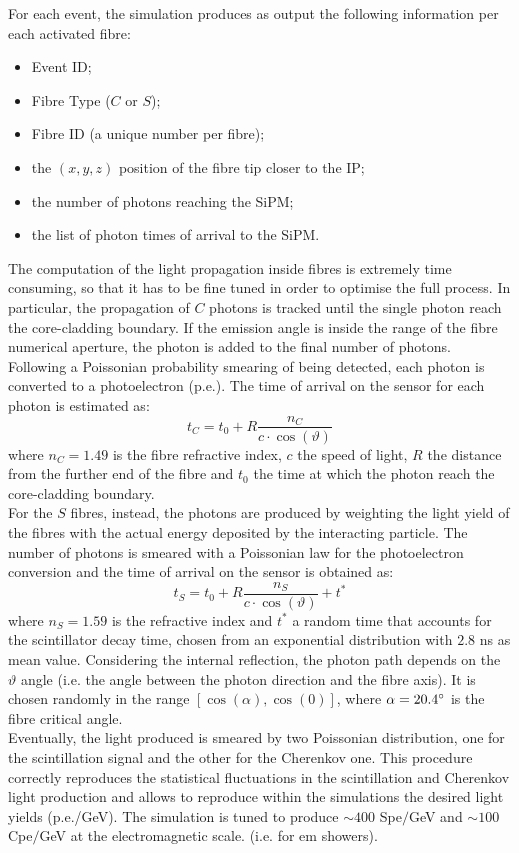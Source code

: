 For each event, the simulation produces as output the following information per each activated fibre: 
\begin{itemize}
	\item Event ID;
	\item Fibre Type ($C$ or $S$);
	\item Fibre ID (a unique number per fibre);
	\item the $(x,y,z)$ position of the fibre tip closer to the IP;
	\item the number of photons reaching the SiPM;
	\item the list of photon times of arrival to the SiPM.
\end{itemize}

The computation of the light propagation inside fibres is extremely time consuming, so that it has to be fine tuned in order to optimise the full process. In particular, the propagation of $C$ photons is tracked until the single photon reach the core-cladding boundary. If the emission angle is inside the range of the fibre numerical aperture, the photon is added to the final number of photons. Following a Poissonian probability smearing of being detected, each photon is converted to a photoelectron (p.e.).
The time of arrival on the sensor for each photon is estimated as:
\begin{equation}
t_C = t_0 + R \frac{n_C}{c\cdot \cos(\vartheta)}
\end{equation}
where $n_C = 1.49$ is the fibre refractive index, $c$ the speed of light, $R$ the distance from the further end of the fibre and $t_0$ the time at which the photon reach the core-cladding boundary.\\

For the $S$ fibres, instead, the photons are produced by weighting the light yield of the fibres with the actual energy deposited by the interacting particle. The number of photons is smeared with a Poissonian law for the photoelectron conversion and the time of arrival on the sensor is obtained as:
\begin{equation}
	t_S = t_0 + R\frac{n_S}{c\cdot \cos(\vartheta)} + t^*
\end{equation}
where $n_S = 1.59$ is the refractive index and $t^*$ a random time that accounts for the scintillator decay time, chosen from an exponential distribution with $2.8$ ns as mean value.
Considering the internal reflection, the photon path depends on the $\vartheta$ angle (i.e. the angle between the photon direction and the fibre axis). It is chosen randomly in the range $[\cos(\alpha),\cos(0)]$, where $\alpha = 20.4\degree$ is the fibre critical angle.\\
Eventually, the light produced is smeared by two Poissonian distribution, one for the scintillation signal and the other for the Cherenkov one. This procedure correctly reproduces the statistical fluctuations in the scintillation and Cherenkov light production and allows to reproduce within the simulations the desired light yields (p.e./GeV).
The simulation is tuned to produce $\sim 400$ Spe$/$GeV and $\sim 100$ Cpe$/$GeV at the electromagnetic scale. (i.e. for em showers).

